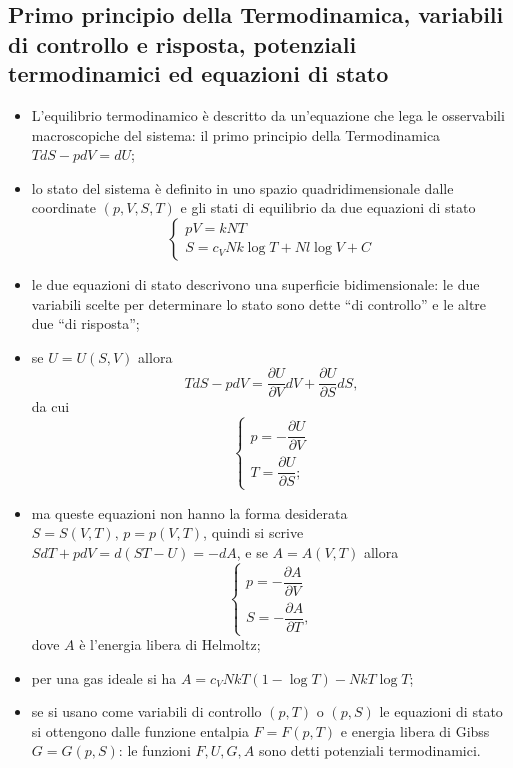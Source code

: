 \documentclass{article}
\theoremstyle{remark}
\begin{document}
\subsection{Primo principio della Termodinamica, variabili di controllo e risposta, potenziali termodinamici ed equazioni di stato}
\begin{itemize}
    \item L'equilibrio termodinamico è descritto da un'equazione che lega le osservabili macroscopiche del sistema: il primo principio della Termodinamica $TdS-pdV=dU$;
    \item lo stato del sistema è definito in uno spazio quadridimensionale dalle coordinate $(p,V,S,T)$ e gli stati di equilibrio da due equazioni di stato
    \begin{equation}
        \begin{cases}
            pV=kNT \\
            S=c_VNk\log{T}+Nl\log{V}+C
        \end{cases}
    \end{equation}
    \item le due equazioni di stato descrivono una superficie bidimensionale: le due variabili scelte per determinare lo stato sono dette ``di controllo'' e le altre due ``di risposta'';
    \item se $U=U(S,V)$ allora
    \begin{equation}
        TdS-pdV=\frac{\partial U}{\partial V}dV+\frac{\partial U}{\partial S}dS,
    \end{equation}
    da cui
    \begin{equation}
        \begin{cases}
            p=-\dfrac{\partial U}{\partial V} \\[1ex]
            T= \dfrac{\partial U}{\partial S};
        \end{cases}
    \end{equation}
    \item ma queste equazioni non hanno la forma desiderata $S=S(V,T),\,p=p(V,T)$, quindi si scrive $SdT+pdV=d(ST-U)=-dA$, e se $A=A(V,T)$ allora
    \begin{equation}
        \begin{cases}
            p= -\dfrac{\partial A}{\partial V} \\[1ex]
            S= -\dfrac{\partial A}{\partial T},
        \end{cases}
    \end{equation}
    dove $A$ è l'energia libera di Helmoltz;
    \item per una gas ideale si ha $A=c_VNkT(1-\log{T})-NkT\log{T}$;
    \item se si usano come variabili di controllo $(p,T)$ o $(p,S)$ le equazioni di stato si ottengono dalle funzione entalpia $F=F(p,T)$ e energia libera di Gibss $G=G(p,S)$: le funzioni $F,U,G,A$ sono detti potenziali termodinamici.
\end{itemize}
\end{document}

